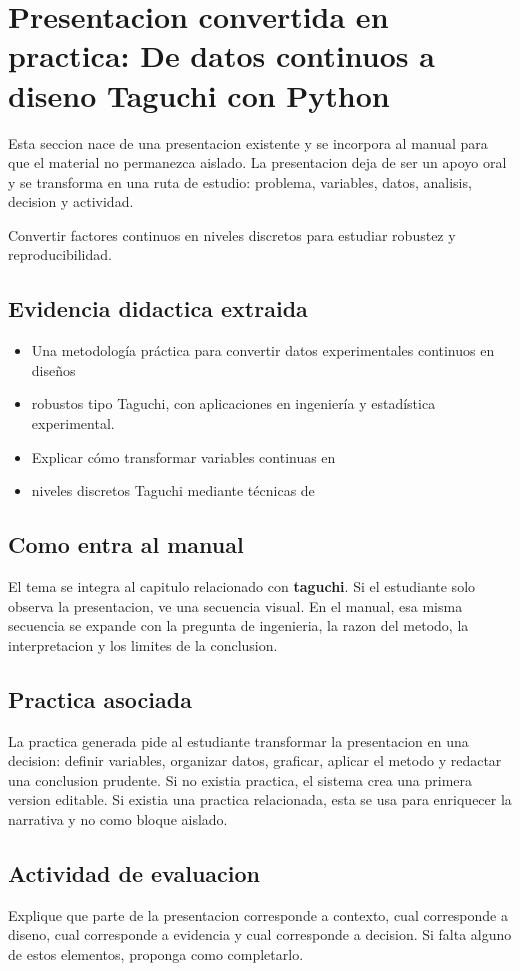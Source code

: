 \section{Presentacion convertida en practica: De datos continuos a diseno Taguchi con Python}

Esta seccion nace de una presentacion existente y se incorpora al manual para que el material no permanezca aislado. La presentacion deja de ser un apoyo oral y se transforma en una ruta de estudio: problema, variables, datos, analisis, decision y actividad.

\begin{idea}
Convertir factores continuos en niveles discretos para estudiar robustez y reproducibilidad.
\end{idea}

\subsection{Evidencia didactica extraida}

\begin{itemize}
\item Una metodología práctica para convertir datos experimentales continuos en diseños
\item robustos tipo Taguchi, con aplicaciones en ingeniería y estadística experimental.
\item Explicar cómo transformar variables continuas en
\item niveles discretos Taguchi mediante técnicas de
\end{itemize}

\subsection{Como entra al manual}

El tema se integra al capitulo relacionado con \textbf{taguchi}. Si el estudiante solo observa la presentacion, ve una secuencia visual. En el manual, esa misma secuencia se expande con la pregunta de ingenieria, la razon del metodo, la interpretacion y los limites de la conclusion.

\subsection{Practica asociada}

La practica generada pide al estudiante transformar la presentacion en una decision: definir variables, organizar datos, graficar, aplicar el metodo y redactar una conclusion prudente. Si no existia practica, el sistema crea una primera version editable. Si existia una practica relacionada, esta se usa para enriquecer la narrativa y no como bloque aislado.

\subsection{Actividad de evaluacion}

Explique que parte de la presentacion corresponde a contexto, cual corresponde a diseno, cual corresponde a evidencia y cual corresponde a decision. Si falta alguno de estos elementos, proponga como completarlo.
